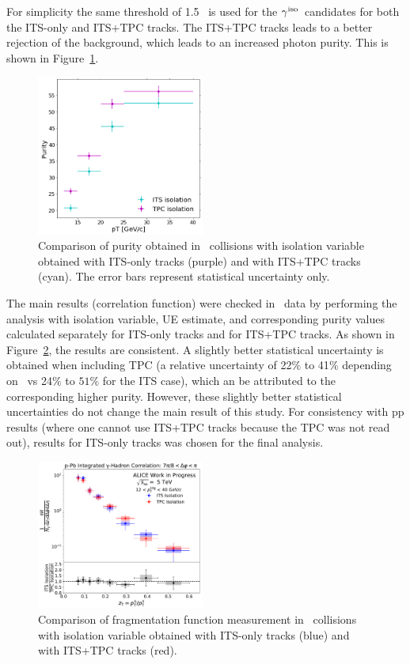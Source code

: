 For simplicity the same threshold of 1.5 \GeVc~is used for the $\gamma^\mathrm{iso}$~candidates for both the ITS-only and ITS+TPC tracks. The ITS+TPC tracks leads to a better rejection of the background, which leads to an increased photon purity. This is shown in Figure~\ref{fig:ComparisonTPCITSiso_purity}. 

\begin{figure}[hbtp]
	\center
	\includegraphics[width=0.49\textwidth]{Checks_Systematics/PurityITSTPC.png}
	\caption{Comparison of purity obtained in \pPb~collisions with isolation variable obtained with ITS-only tracks (purple) and with ITS+TPC tracks (cyan). The error bars represent statistical uncertainty only. }
	\label{fig:ComparisonTPCITSiso_purity}
\end{figure}

The main results (correlation function) were checked in \pPb~data by performing the analysis with isolation variable, UE estimate, and corresponding purity values calculated separately for ITS-only tracks and for ITS+TPC tracks. As shown in Figure~\ref{fig:ComparisonTPCITSiso_frag}, the results are consistent. A slightly better statistical uncertainty is obtained when including TPC (a relative uncertainty of 22$\%$ to 41$\%$ depending on \zt~vs 24$\%$ to $51\%$ for the ITS case), which an be attributed to the corresponding higher purity. However, these slightly better statistical uncertainties do not change the main result of this study. For consistency with pp results (where one cannot use ITS+TPC tracks because the TPC was not read out), results for ITS-only tracks was chosen for the final analysis. 

\begin{figure}[hbtp]
	\center
	\includegraphics[width=0.49\textwidth]{Checks_Systematics/ISO_Compare_Final_FFunction_and_Ratio}
	\caption{Comparison of fragmentation function measurement in \pPb~collisions with isolation variable obtained with ITS-only tracks (blue) and with ITS+TPC tracks (red).}
	\label{fig:ComparisonTPCITSiso_frag}
\end{figure}

